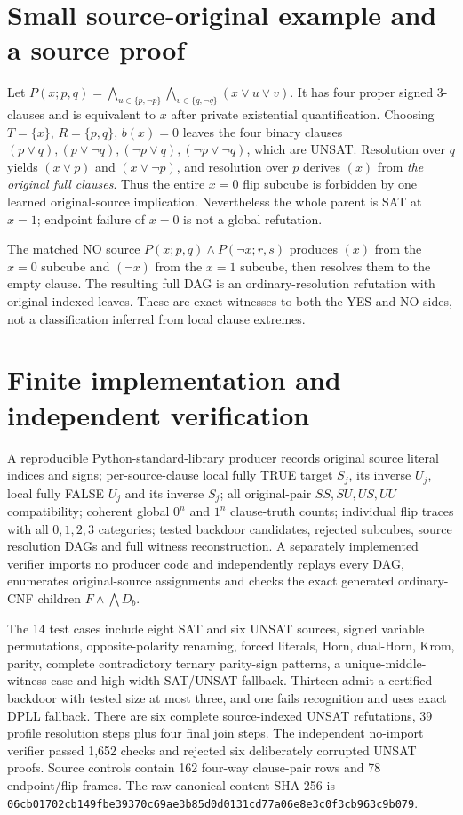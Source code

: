 \documentclass[11pt]{article}
\begin{document}
\section{Small source-original example and a source proof}
Let $P(x;p,q)=\bigwedge_{u\in\{p,\neg p\}}\bigwedge_{v\in\{q,\neg q\}}(x\vee u\vee v)$. It has four proper signed 3-clauses and is equivalent to $x$ after private existential quantification. Choosing $T=\{x\}$, $R=\{p,q\}$, $b(x)=0$ leaves the four binary clauses $(p\vee q),(p\vee\neg q),(\neg p\vee q),(\neg p\vee\neg q)$, which are UNSAT. Resolution over $q$ yields $(x\vee p)$ and $(x\vee\neg p)$, and resolution over $p$ derives $(x)$ from \emph{the original full clauses}. Thus the entire $x=0$ flip subcube is forbidden by one learned original-source implication. Nevertheless the whole parent is SAT at $x=1$; endpoint failure of $x=0$ is not a global refutation.

The matched NO source $P(x;p,q)\wedge P(\neg x;r,s)$ produces $(x)$ from the $x=0$ subcube and $(\neg x)$ from the $x=1$ subcube, then resolves them to the empty clause. The resulting full DAG is an ordinary-resolution refutation with original indexed leaves. These are exact witnesses to both the YES and NO sides, not a classification inferred from local clause extremes.

\section{Finite implementation and independent verification}
A reproducible Python-standard-library producer records original source literal indices and signs; per-source-clause local fully TRUE target $S_j$, its inverse $U_j$, local fully FALSE $U_j$ and its inverse $S_j$; all original-pair $SS,SU,US,UU$ compatibility; coherent global $0^n$ and $1^n$ clause-truth counts; individual flip traces with all $0,1,2,3$ categories; tested backdoor candidates, rejected subcubes, source resolution DAGs and full witness reconstruction. A separately implemented verifier imports no producer code and independently replays every DAG, enumerates original-source assignments and checks the exact generated ordinary-CNF children $F\land \bigwedge D_b$.

The 14 test cases include eight SAT and six UNSAT sources, signed variable permutations, opposite-polarity renaming, forced literals, Horn, dual-Horn, Krom, parity, complete contradictory ternary parity-sign patterns, a unique-middle-witness case and high-width SAT/UNSAT fallback. Thirteen admit a certified backdoor with tested size at most three, and one fails recognition and uses exact DPLL fallback. There are six complete source-indexed UNSAT refutations, 39 profile resolution steps plus four final join steps. The independent no-import verifier passed 1,652 checks and rejected six deliberately corrupted UNSAT proofs. Source controls contain 162 four-way clause-pair rows and 78 endpoint/flip frames. The raw canonical-content SHA-256 is \texttt{06cb01702cb149fbe39370c69ae3b85d0d0131cd77a06e8e3c0f3cb963c9b079}.
\end{document}
